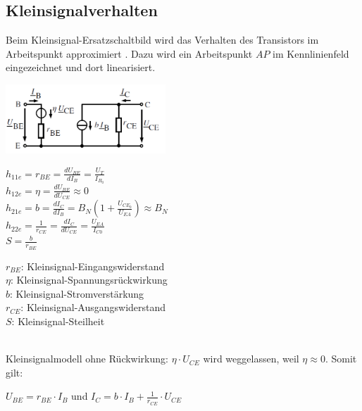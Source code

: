 	\subsection{Kleinsignalverhalten}
		Beim Kleinsignal-Ersatzschaltbild wird das Verhalten des Transistors im Arbeitspunkt
		approximiert . Dazu wird ein Arbeitspunkt $AP$ im Kennlinienfeld eingezeichnet
		und dort linearisiert. \\
		\begin{minipage}[c]{6cm}
			\includegraphics[width=6cm]{images/bip-kleinsignal}
		\end{minipage}
		\begin{minipage}[c]{6cm}
			$h_{11e} = r_{BE} = \frac{dU_{BE}}{dI_{B}} = \frac{U_T}{I_{B_0}}$ \\
			$h_{12e} = \eta = \frac{dU_{BE}}{dU_{CE}} \approx 0$ \\
			$h_{21e} = b = \frac{dI_C}{dI_B} = B_N(1+\frac{U_{CE_0}}{U_{EA}}) \approx B_N$ \\
			$h_{22e} = \frac{1}{r_{CE}} = \frac{dI_C}{dU_{CE}} = \frac{U_{EA}}{I_{C0}}$ \\
			$S = \frac{b}{r_{BE}}$
		\end{minipage}
		\begin{minipage}[c]{6cm}
			$r_{BE}$: Kleinsignal-Eingangswiderstand \\
			$\eta$: Kleinsignal-Spannungsrückwirkung \\
			$b$: Kleinsignal-Stromverstärkung \\
			$r_{CE}$: Kleinsignal-Ausgangswiderstand \\
			$S$: Kleinsignal-Steilheit
		\end{minipage} \\
		Kleinsignalmodell ohne Rückwirkung: $\eta \cdot U_{CE}$ wird weggelassen, weil 
		$\eta \approx 0$. Somit gilt: \\
		\begin{center}
			$\boxed{U_{BE} = r_{BE} \cdot I_B}$ \hspace{1cm} und \hspace{1cm}
			$\boxed{I_C = b \cdot I_B + \frac{1}{r_{CE}} \cdot U_{CE}}$ \\
		\end{center}
		
